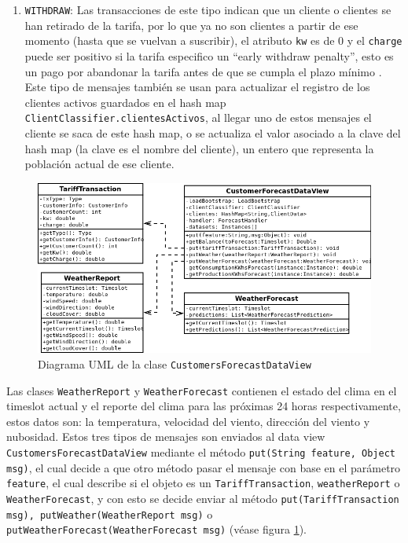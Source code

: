 \begin{enumerate}
	\item \texttt{WITHDRAW}: Las transacciones de este tipo indican que un cliente o clientes se han retirado de la tarifa, por lo que ya no son clientes a partir de ese momento (hasta que se vuelvan a suscribir), el atributo \texttt{kw} es de 0 y el \texttt{charge} puede ser positivo si la tarifa especifico un ``early withdraw penalty'', esto es un pago por abandonar la tarifa antes de que se cumpla el plazo mínimo \cite{WKetterJCollinsyMdWeerdtThe2017PowerTAC}. Este tipo de mensajes también se usan para actualizar el registro de los clientes activos guardados en el hash map%
	 \texttt{ClientClassifier.clientesActivos}, al llegar uno de estos mensajes el cliente se saca de este hash map, o se actualiza el valor asociado a la clave del hash map (la clave es el nombre del cliente), un entero que representa la población actual de ese cliente.
\end{enumerate}

\begin{figure}[h]
	\centering
	\includegraphics[width=15cm]{img/UMLCustomerForecastDataview.png}
	\caption{Diagrama UML de la clase \texttt{CustomersForecastDataView}}
	\label{fig:UMLCustomerForecastDataview}
\end{figure}

Las clases \texttt{WeatherReport} y \texttt{WeatherForecast} contienen el estado del clima en el timeslot actual y el reporte del clima para las próximas 24 horas respectivamente, estos datos son: la temperatura, velocidad del viento, dirección del viento y nubosidad.
Estos tres tipos de mensajes son enviados al data view \texttt{CustomersForecastDataView} mediante el método \texttt{put(String feature, Object msg)}, el cual decide a que otro método pasar el mensaje con base en el parámetro \texttt{feature}, el cual describe si el objeto es un \texttt{TariffTransaction}, \texttt{weatherReport} o \texttt{WeatherForecast}, y con esto se decide enviar al método \texttt{put(TariffTransaction msg), putWeather(WeatherReport msg)} o \texttt{putWeatherForecast(WeatherForecast msg)} (véase figura \ref{fig:UMLCustomerForecastDataview}).

